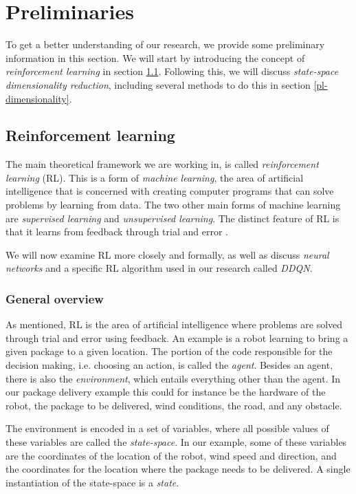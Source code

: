 \chapter{Preliminaries}\label{preliminaries}
To get a better understanding of our research, we provide some preliminary information in this section. We will start by introducing the concept of \emph{reinforcement learning} in section \ref{pl-rl}. Following this, we will discuss \emph{state-space dimensionality reduction}, including several methods to do this in section \ref{pl-dimensionality}.
 
\section{Reinforcement learning}\label{pl-rl}
The main theoretical framework we are working in, is called \emph{reinforcement learning} (RL). This is a form of \emph{machine learning}, the area of artificial intelligence that is concerned with creating computer programs that can solve problems by learning from data. The two other main forms of machine learning are \emph{supervised learning} and \emph{unsupervised  learning}. The distinct feature of RL is that it learns from feedback through trial and error \cite[p. 2-5]{grokking}.

We will now examine RL more closely and formally, as well as discuss \emph{neural networks} and a specific RL algorithm used in our research called \emph{DDQN}.

 
\subsection{General overview}
As mentioned, RL is the area of artificial intelligence where problems are solved through trial and error using feedback. An example is a robot learning to bring a given package to a given location. The portion of the code responsible for the decision making, i.e. choosing an action, is called the \emph{agent}. Besides an agent, there is also the \emph{environment}, which entails everything other than the agent. In our package delivery example this could for instance be the hardware of the robot, the package to be delivered, wind conditions, the road, and any obstacle.

The environment is encoded in a set of variables, where all possible values of these variables are called the \emph{state-space}. In our example, some of these variables are the coordinates of the location of the robot, wind speed and direction, and the coordinates for the location where the package needs to be delivered. A single instantiation of the state-space is a \emph{state}. 

